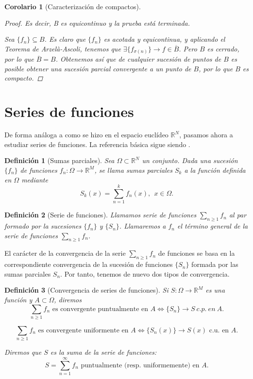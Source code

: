 \documentclass[11pt, a4paper]{article}
\newcommand{\fn}{\{f_n\}}
\theoremstyle{theorem-style}
\newtheorem{ncor}{Corolario}[section]
\theoremstyle{definition-style}
\newtheorem{ndef}{Definición}[section]
\theoremstyle{remark-style}
\theoremstyle{example-style}
\begin{document}
\begin{ncor}[Caracterización de compactos]
\begin{proof}
    Es decir, B es equicontinuo y la prueba está terminada.

    \boxed{\Leftarrow} Sea $\fn \subseteq B$. Es claro que $\fn$ es acotada y equicontinua, y aplicando el \textit{Teorema de Arzelà-Ascoli}, tenemos que $\exists \{f_{\sigma(n)}\} \to f \in \overline{B}$. Pero $B$ es cerrado, por lo que $\overline{B} = B$. Obtenemos así que de cualquier sucesión de puntos de $B$ es posible obtener una sucesión parcial convergente a un punto de $B$, por lo que $B$ es compacto.
  \end{proof}
  
\end{ncor}

\newpage



\section{Series de funciones}

De forma análoga a como se hizo en el espacio euclídeo $\mathbb{R}^N$, pasamos ahora a estudiar series de funciones. La referencia básica sigue siendo \cite[Capítulo 5]{marsden}.

\begin{ndef}[Sumas parciales]
  Sea $\Omega\subset \mathbb R^N$ un conjunto. 
  Dada una sucesi\'on $\{f_n \}$ de funciones $f_n : \Omega \longrightarrow \mathbb R^M$, se llama sumas parciales $S_k$ a la funci\'on definida en $\Omega$ mediante
  \[ 
    S_k (x) = \sum_{n=1}^{k} f_n(x),\ \ x\in\Omega.
  \] 
\end{ndef}

\begin{ndef}[Serie de funciones]
  Llamamos serie  de funciones $\sum_{n\geq 1} f_n$ al par formado por la sucesiones  $\{ f_n \}$ y $\{S_n\}$. Llamaremos a $f_n$ el t\'ermino general de la serie de funciones $\displaystyle\sum_{n\geq 1} f_n$.
\end{ndef}


El car\'acter de la convergencia de la serie $\sum_{n\geq 1} f_n$ de funciones se basa en la correspondiente convergencia de la sucesi\'on de funciones $\{S_n\}$ formada por las sumas parciales $S_n$. Por tanto, tenemos de nuevo dos tipos de convergencia.
\begin{ndef}[Convergencia de series de funciones]
  Si $S:\Omega\longrightarrow \mathbb R^M$ es una funci\'on y $A\subset \Omega$, diremos 
  $$\sum_{n\geq 1} f_n  \mbox{ es convergente puntualmente en } A \Leftrightarrow \{S_n \} \longrightarrow S\ c.p.\ en\ A.$$

  $$\sum_{n\geq 1} f_n  \mbox{ es convergente uniformente en }A \Leftrightarrow \{S_n(x)\} \longrightarrow S(x) \mbox{ c.u. en }A.$$ 

  Diremos que $S$ es la suma de la serie de funciones: 
  \[
    S=\displaystyle \sum_{n=1}^{\infty} f_n \mbox{ puntualmente (resp. uniformemente) en $A$.}
  \]
\end{ndef}
\end{document}
